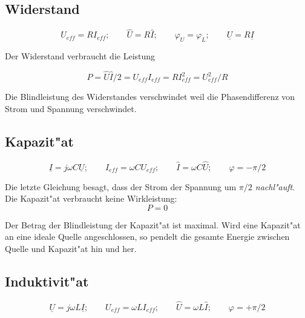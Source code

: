 \documentclass[german, 10pt, a4paper, headsepline]{scrreprt}
\theoremstyle{remark}
\begin{document}
\subsection{Widerstand}

\begin{displaymath}
	U_{eff} = RI_{eff};\qquad \hat{U}=R\hat{I}; \qquad \varphi_U = \varphi_L; \qquad \underline{U}=R\underline{I}
\end{displaymath}

Der Widerstand verbraucht die Leistung

\begin{displaymath}
	P = \hat{U}\hat{I}/2 = U_{eff}I_{eff}=RI_{eff}^2=U_{eff}^2/R
\end{displaymath}

Die Blindleistung des Widerstandes verschwindet weil die Phasendifferenz von Strom und Spannung verschwindet.

\subsection{Kapazit"at}

\begin{displaymath}
	\underline{I} = j\omega C \underline{U}; \qquad I_{eff} = \omega CU_{eff}; \qquad \hat{I} = \omega C\hat{U}; \qquad \varphi = -\pi/2
\end{displaymath}

Die letzte Gleichung besagt, dass der Strom der Spannung um \textit{$\pi/2$ nachl"auft}.\\

Die Kapazit"at verbraucht keine Wirkleistung:
\begin{displaymath}
	P = 0
\end{displaymath}

Der Betrag der Blindleistung der Kapazit"at ist maximal. Wird eine Kapazit"at an eine ideale Quelle angeschlossen, so pendelt die gesamte Energie zwischen Quelle und Kapazit"at hin und her.

\subsection{Induktivit"at}

\begin{displaymath}
	\underline{U} = j\omega L \underline{I}; \qquad U_{eff} = \omega LI_{eff}; \qquad \hat{U} = \omega L\hat{I}; \qquad \varphi = +\pi/2
\end{displaymath}
\end{document}
